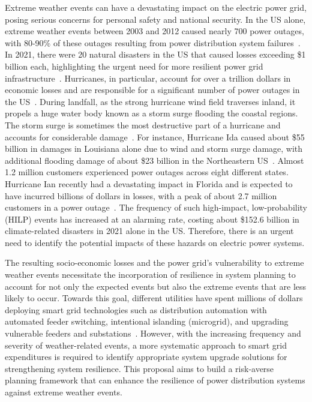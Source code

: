 \documentclass[hidelinks, 12pt]{article}
\begin{document}

Extreme weather events can have a devastating impact on the electric power grid, posing serious concerns for personal safety and national security. In the US alone, extreme weather events between 2003 and 2012 caused nearly 700 power outages, with 80-90\% of these outages resulting from power distribution system failures~\cite{DOE_res}. In 2021, there were 20 natural disasters in the US that caused losses exceeding \$1 billion each, highlighting the urgent need for more resilient power grid infrastructure~\cite{noaa}. Hurricanes, in particular, account for over a trillion dollars in economic losses and are responsible for a significant number of power outages in the US~\cite{cost_NOAA, 2020}. During landfall, as the strong hurricane wind field traverses inland, it propels a huge water body known as a storm surge flooding the coastal regions. The storm surge is sometimes the most destructive part of a hurricane and accounts for considerable damage~\cite{surge_web}. For instance, Hurricane Ida caused about \$55 billion in damages in Louisiana alone due to wind and storm surge damage, with additional flooding damage of about \$23 billion in the Northeastern US~\cite{IDA_NOAA}. Almost 1.2 million customers experienced power outages across eight different states. Hurricane Ian recently had a devastating impact in Florida and is expected to have incurred billions of dollars in losses, with a peak of about 2.7 million customers in a power outage~\cite{DOE_IAN}. The frequency of such high-impact, low-probability (HILP) events has increased at an alarming rate, costing about \$152.6 billion in climate-related disasters in 2021 alone in the US. Therefore, there is an urgent need to identify the potential impacts of these hazards on electric power systems. 

The resulting socio-economic losses and the power grid's vulnerability to extreme weather events necessitate the incorporation of resilience in system planning to account for not only the expected events but also the extreme events that are less likely to occur. Towards this goal, different utilities have spent millions of dollars deploying smart grid technologies such as distribution automation with automated feeder switching, intentional islanding (microgrid), and upgrading vulnerable feeders and substations~\cite{9120304}. However, with the increasing frequency and severity of weather-related events, a more systematic approach to smart grid expenditures is required to identify appropriate system upgrade solutions for strengthening system resilience. This proposal aims to build a risk-averse planning framework that can enhance the resilience of power distribution systems against extreme weather events.
\end{document}
